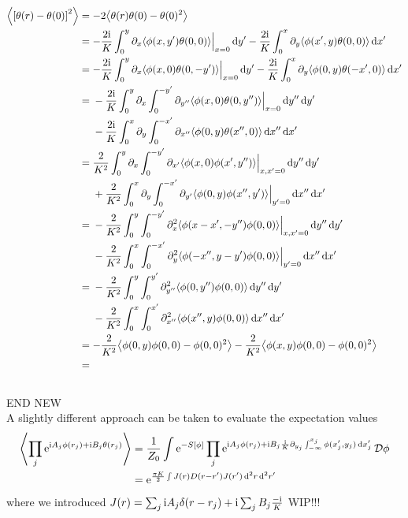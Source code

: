 \documentclass[english, parskip=full]{scrartcl}
\begin{document}
\begin{align}
\bra*{\klb*{\theta(r) - \theta(0)}^2} &= -2\bra*{\theta(r) \theta(0) - \theta(0)^2}\\
&= -\frac{2\i}{K} \intx{0}{y}{\partial_x \bra*{\phi(x,y')\theta(0,0)}\Big\vert_{x=0}}{y'} - \frac{2\i}{K} \intx{0}{x}{\partial_y \bra*{\phi(x',y) \theta(0,0)}}{x'}\\
&= -\frac{2\i}{K} \intx{0}{y}{\partial_x \bra*{\phi(x,0)\theta(0,-y')}\Big\vert_{x=0}}{y'} - \frac{2\i}{K} \intx{0}{x}{\partial_y \bra*{\phi(0,y) \theta(-x',0)}}{x'}\\
&= \bsplit{&-\frac{2\i}{K} \intx{0}{y}{\partial_x \intx{0}{-y'}{\partial_{y''} \bra*{\phi(x,0)\theta(0,y'')}\Big\vert_{x=0} }{y''} }{y'} \\
&- \frac{2\i}{K} \intx{0}{x}{\partial_y \intx{0}{-x'}{\partial_{x''} \bra*{\phi(0,y)\theta(x'',0)}}{x''}}{x'}}\\
&= \bsplit{&\frac{2}{K^2} \intx{0}{y}{\partial_x \intx{0}{-y'}{\partial_{x'} \bra*{\phi(x,0)\phi(x',y'')}\Big\vert_{x,x'=0} }{y''} }{y'} \\
&+ \frac{2}{K^2} \intx{0}{x}{\partial_y \intx{0}{-x'}{\partial_{y'} \bra*{\phi(0,y)\phi(x'',y')} \Big\vert_{y'=0}}{x''}}{x'}}\\
&= \bsplit{&-\frac{2}{K^2} \intx{0}{y}{\intx{0}{-y'}{\partial_x^2 \bra*{\phi(x-x',-y'')\phi(0,0)} \Big\vert_{x,x'=0}}{y''}}{y'}\\
&- \frac{2}{K^2} \intx{0}{x}{\intx{0}{-x'}{\partial_y^2 \bra*{\phi(-x'',y-y')\phi(0,0)} \Big\vert_{y'=0}}{x''}}{x'}}\\
&= \bsplit{&-\frac{2}{K^2} \intx{0}{y}{\intx{0}{y'}{\partial_{y''}^2 \bra*{\phi(0,y'')\phi(0,0)}}{y''}}{y'}\\
&- \frac{2}{K^2} \intx{0}{x}{\intx{0}{x'}{\partial_{x''}^2 \bra*{\phi(x'',y)\phi(0,0)}}{x''}}{x'}}\\
&= -\frac{2}{K^2} \bra*{\phi(0,y)\phi(0,0) - \phi(0,0)^2} - \frac{2}{K^2} \bra*{\phi(x,y)\phi(0,0) - \phi(0,0)^2}\\
&= 
\end{align}
\\END NEW\\
A slightly different approach can be taken to evaluate the expectation values
\begin{align}
\bra*{\prod_j \powe{\i A_j \phi(r_j) + \i B_j\theta(r_j)}} &= \frac{1}{Z_0} \int \powe{-S[\phi]} \prod_j \powe{\i A_j \phi(r_j) + \i B_j \frac{\i}{K} \partial_{y_j} \intx{-\infty}{x_j}{\phi(x_j', y_j)}{x_j'}}\,\mathcal{D}\phi\\
&= \powe{\frac{\pi K}{2}\int J(r) D(r-r') J(r')\,\d^2r\,\d^2r' }
\end{align}
where we introduced $J(r) = \sum_j \i A_j \delta(r-r_j) + \i\sum_j B_j \frac{-\i}{K}  $ WIP!!!
\end{document}
